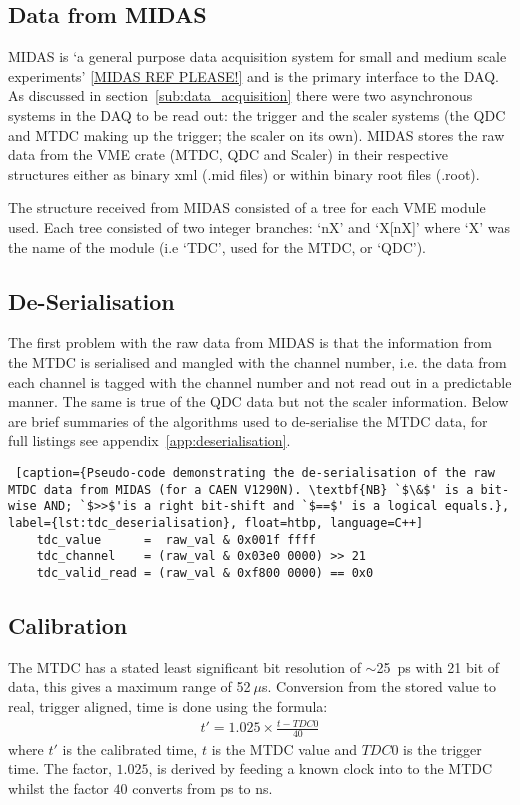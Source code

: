 \documentclass[]{article}
\newcommand{\ms}{$~\mu$s}
\begin{document}
\subsection{Data from MIDAS} %
\label{sub:data_from_midas}
MIDAS is `a general purpose data acquisition system for small and medium scale experiments' \ref{MIDAS REF PLEASE!} and is the primary interface to the DAQ. As discussed in section~\ref{sub:data_acquisition} there were two asynchronous systems in the DAQ to be read out: the trigger and the scaler systems (the QDC and MTDC making up the trigger; the scaler on its own). MIDAS stores the raw data from the VME crate (MTDC, QDC and Scaler) in their respective structures either as binary xml (.mid files) or within binary root files (.root).

The structure received from MIDAS consisted of a tree for each VME module used. Each tree consisted of two integer branches: `nX' and `X[nX]' where `X' was the name of the module (i.e `TDC', used for the MTDC, or `QDC').
\subsection{De-Serialisation} %
\label{sub:de_serialisation}
The first problem with the raw data from MIDAS is that the information from the MTDC is serialised and mangled with the channel number, i.e. the data from each channel is tagged with the channel number and not read out in a predictable manner. The same is true of the QDC data but not the scaler information. Below are brief summaries of the algorithms used to de-serialise the MTDC data, for full listings see appendix~\ref{app:deserialisation}.
%
\begin{center}
\begin{lstlisting} [caption={Pseudo-code demonstrating the de-serialisation of the raw MTDC data from MIDAS (for a CAEN V1290N). \textbf{NB} `$\&$' is a bit-wise AND; `$>>$'is a right bit-shift and `$==$' is a logical equals.}, label={lst:tdc_deserialisation}, float=htbp, language=C++]
    tdc_value      =  raw_val & 0x001f ffff
    tdc_channel    = (raw_val & 0x03e0 0000) >> 21
    tdc_valid_read = (raw_val & 0xf800 0000) == 0x0
\end{lstlisting}
\end{center}
\subsection{Calibration} %
\label{sub:calibration}
The MTDC has a stated least significant bit resolution of $\sim$25~ps with 21 bit of data, this gives a maximum range of 52\ms{}. Conversion from the stored value to real, trigger aligned, time is done using the formula:
\begin{align}\label{equ:tdc_calibration}
	t' = 1.025\times\frac{t - TDC0}{40}
\end{align}
where $t'$ is the calibrated time, $t$ is the MTDC value and $TDC0$ is the trigger time. The factor, $1.025$, is derived by feeding a known clock into to the MTDC whilst the factor $40$ converts from ps to ns.
\end{document}
